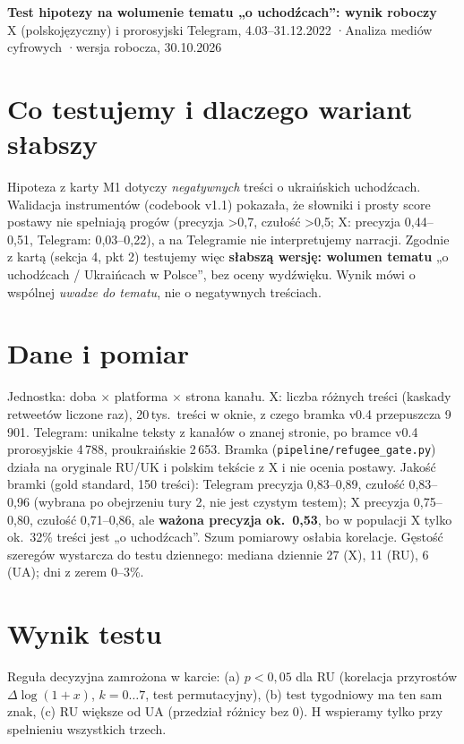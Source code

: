 \documentclass[10pt,a4paper]{article}
\begin{document}
\small
\begin{center}{\large\bfseries Test hipotezy na wolumenie tematu „o uchodźcach”: wynik roboczy}\\[1pt]
X (polskojęzyczny) i prorosyjski Telegram, 4.03--31.12.2022 \quad·\quad Analiza mediów cyfrowych \quad·\quad wersja robocza, 30.10.2026\end{center}

\section{Co testujemy i dlaczego wariant słabszy}
Hipoteza z karty M1 dotyczy \emph{negatywnych} treści o ukraińskich uchodźcach. Walidacja instrumentów (codebook v1.1) pokazała, że słowniki i prosty score postawy nie spełniają progów (precyzja \textgreater 0,7, czułość \textgreater 0,5; X: precyzja 0,44--0,51, Telegram: 0,03--0,22), a na Telegramie nie interpretujemy narracji. Zgodnie z kartą (sekcja 4, pkt 2) testujemy więc \textbf{słabszą wersję: wolumen tematu} „o uchodźcach / Ukraińcach w Polsce”, bez oceny wydźwięku. Wynik mówi o wspólnej \emph{uwadze do tematu}, nie o negatywnych treściach.

\section{Dane i pomiar}
Jednostka: doba $\times$ platforma $\times$ strona kanału. X: liczba różnych treści (kaskady retweetów liczone raz), 20\,tys.\ treści w oknie, z czego bramka v0.4 przepuszcza 9\,901. Telegram: unikalne teksty z kanałów o znanej stronie, po bramce v0.4 prorosyjskie 4\,788, proukraińskie 2\,653. Bramka (\texttt{pipeline/refugee\_gate.py}) działa na oryginale RU/UK i polskim tekście z X i nie ocenia postawy.
Jakość bramki (gold standard, 150 treści): Telegram precyzja 0,83--0,89, czułość 0,83--0,96 (wybrana po obejrzeniu tury 2, nie jest czystym testem); X precyzja 0,75--0,80, czułość 0,71--0,86, ale \textbf{ważona precyzja ok.\ 0,53}, bo w populacji X tylko ok.\ 32\% treści jest „o uchodźcach”. Szum pomiarowy osłabia korelacje.
Gęstość szeregów wystarcza do testu dziennego: mediana dziennie 27 (X), 11 (RU), 6 (UA); dni z zerem 0--3\%.

\section{Wynik testu}
Reguła decyzyjna zamrożona w karcie: (a) $p<0{,}05$ dla RU (korelacja przyrostów $\Delta\log(1+x)$, $k=0\ldots7$, test permutacyjny), (b) test tygodniowy ma ten sam znak, (c) RU większe od UA (przedział różnicy bez 0). H wspieramy tylko przy spełnieniu wszystkich trzech.
\end{document}
